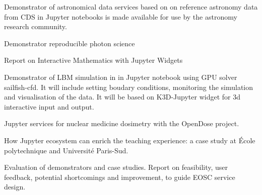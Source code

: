 \begin{workpackage}
\begin{tasklist}
% 







\end{tasklist}



\begin{wpdelivs}
\begin{wpdeliv}[due=42,miles=community,id=application-astro,dissem=PU,nature=DEM,lead=CDS]
    {Demonstrator of astronomical data services based on on reference astronomy data from CDS in Jupyter notebooks is made available for use by the astronomy research community.}
\end{wpdeliv}
\begin{wpdeliv}[due=45,miles=final,id=xfel-workflows,dissem=PU,nature=DEM,lead=XFEL]
  {Demonstrator reproducible photon science}
\end{wpdeliv}

\begin{wpdeliv}[due=36,miles=final,id=math,dissem=PU,nature=R,lead=UPSUD]
  {Report on Interactive Mathematics with Jupyter Widgets}
\end{wpdeliv}
\begin{wpdeliv}[due=24,miles=final,id=lbm-jupyter,dissem=PU,nature=DEM,lead=SIL]
  { Demonstrator of LBM simulation in in Jupyter notebook using GPU solver sailfish-cfd. It will include setting boudary conditions, monitoring the simulation and visualisation of the data. It will be based on K3D-Jupyter widget for 3d interactive input and output.}
\end{wpdeliv}

\begin{wpdeliv}[due=36,miles=community,id=opendose-analysis,dissem=PU,nature=DEM,lead=INSERM]
  {Jupyter services for nuclear medicine dosimetry with the OpenDose project.}
\end{wpdeliv}

\begin{wpdeliv}[due=48,miles=final,id=teaching,dissem=PU,nature=R,lead=EP]
  {How Jupyter ecosystem can enrich the teaching experience: a case study at \'Ecole polytechnique and Université Paris-Sud.}
\end{wpdeliv}
\begin{wpdeliv}[due=48,miles=final,id=applications-report,dissem=PU,nature=R,lead=XFEL]
  {Evaluation of demonstrators and case studies. Report on
    feasibility, user feedback, potential shortcomings and
    improvement, to guide EOSC service design.}
\end{wpdeliv}

\end{wpdelivs}
\end{workpackage}

